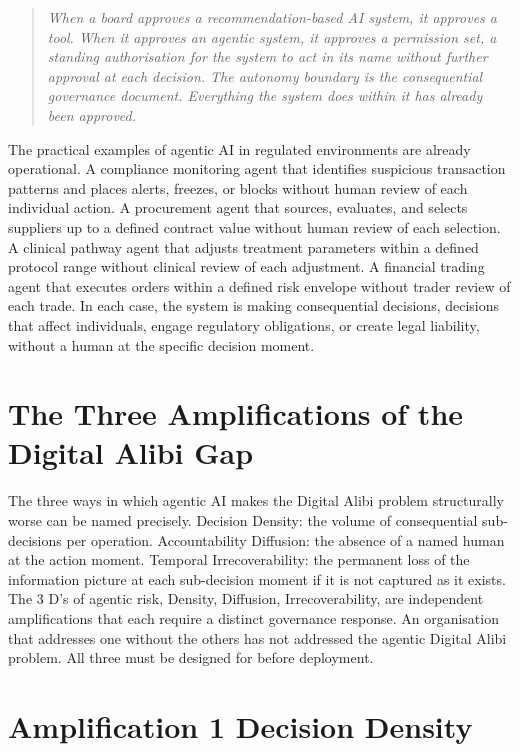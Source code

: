 \begin{quote}
\emph{When a board approves a recommendation-based AI system, it approves a tool. When it approves an agentic system, it approves a permission set, a standing authorisation for the system to act in its name without further approval at each decision. The autonomy boundary is the consequential governance document. Everything the system does within it has already been approved.}
\end{quote}

The practical examples of agentic AI in regulated environments are already operational. A compliance monitoring agent that identifies suspicious transaction patterns and places alerts, freezes, or blocks without human review of each individual action. A procurement agent that sources, evaluates, and selects suppliers up to a defined contract value without human review of each selection. A clinical pathway agent that adjusts treatment parameters within a defined protocol range without clinical review of each adjustment. A financial trading agent that executes orders within a defined risk envelope without trader review of each trade. In each case, the system is making consequential decisions, decisions that affect individuals, engage regulatory obligations, or create legal liability, without a human at the specific decision moment.

\scenebreak

\section{The Three Amplifications of the Digital Alibi Gap}

The three ways in which agentic AI makes the Digital Alibi problem structurally worse can be named precisely. Decision Density: the volume of consequential sub-decisions per operation. Accountability Diffusion: the absence of a named human at the action moment. Temporal Irrecoverability: the permanent loss of the information picture at each sub-decision moment if it is not captured as it exists. The 3 D's of agentic risk, Density, Diffusion, Irrecoverability, are independent amplifications that each require a distinct governance response. An organisation that addresses one without the others has not addressed the agentic Digital Alibi problem. All three must be designed for before deployment.

\section{Amplification 1 Decision Density}


